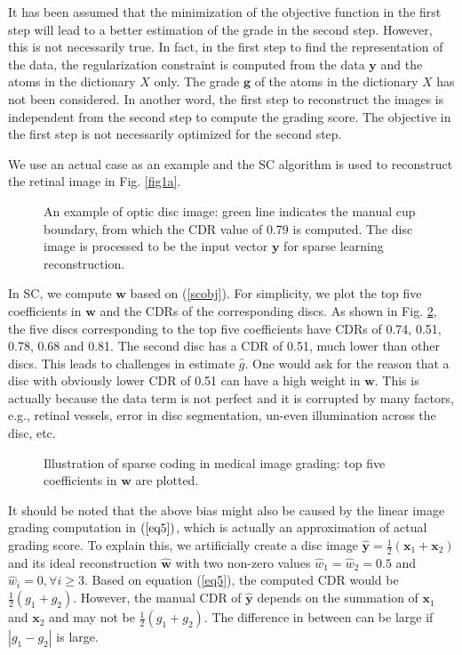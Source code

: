 \documentclass[journal]{IEEEtran}
\begin{document}
 It has been assumed that the minimization of the objective function in the first step will lead to a better estimation of the grade in the second step. However, this is not necessarily  true. 
         In fact, in the first step to find the representation of the data, the regularization constraint is computed from the data $\textbf{y}$ and the atoms in the dictionary $X$ only. The grade $\textbf{g}$ of the atoms in the dictionary $X$ has not been considered.  In another word,  the first step to reconstruct the images is independent from the second step to compute the grading score. The objective in the first step is not necessarily optimized for the second step. 
    
    
    We use an actual  case  as an example and the SC \cite{sparsecoding} algorithm is used to reconstruct the retinal image in Fig. \ref{fig1a}. 
     \begin{figure}
    	\caption{An example of optic disc image: green line indicates the manual cup boundary, from which the CDR value of 0.79 is computed. The disc image is processed to be the input vector $\textbf{y}$ for sparse learning reconstruction. } \label{fig1}
    \end{figure} 
 In SC, we compute $\textbf{w}$ based on (\ref{scobj}).
 For simplicity, we plot the top five coefficients in $\textbf{w}$ and the CDRs of the corresponding discs. As shown in Fig. \ref{fig2}, the five discs corresponding to the top five coefficients have CDRs of 0.74, 0.51, 0.78, 0.68 and 0.81. 
  The second disc has a CDR of 0.51, much lower than other discs.   This   leads to challenges in estimate $\hat{g}$. 
  One would ask for the reason that a disc with obviously lower CDR of 0.51 can have a high weight in $\textbf{w}$. This is actually because the data term is not perfect and it is corrupted by many factors, e.g., retinal vessels, error in disc segmentation, un-even illumination across the disc, etc.   
       \begin{figure}
     	\caption{Illustration of sparse coding in medical image grading: top five  coefficients in $\textbf{w}$ are plotted.  } \label{fig2}
     \end{figure}
 
    
     It should be noted that the above bias might also be caused by the linear image grading computation in $(\ref{eq5})$, which   is actually an approximation of actual grading score. 
To explain this, we  artificially create a disc  image  $\hat{\textbf{y}}=\frac{1}{2}(\textbf{x}_1+\textbf{x}_2)$ and its ideal reconstruction  $\hat{\textbf{w}}$ with two non-zero values $\hat{w}_1=\hat{w}_2=0.5$ and   $\hat{w}_i =0, \forall i\geq 3$. Based on equation (\ref{eq5}), the computed CDR would be $\frac{1}{2}(g_1+g_2)$. However, the manual CDR of $\hat{\textbf{y}}$ depends on the summation of $\textbf{x}_1$ and $\textbf{x}_2$ and may not be $\frac{1}{2}(g_1+g_2)$.  The difference in between  can be large if  $|g_1-g_2|$ is large.
\end{document}

